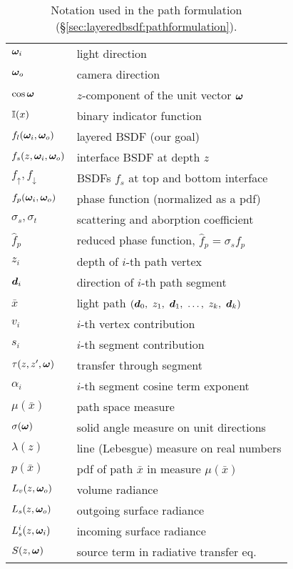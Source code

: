\begin{table}[h]
	\centering
	\caption[Notation used in the path formulation (\S\ref{sec:layeredbsdf:pathformulation})]{\label{tab:layeredbsdf:notation}
	Notation used in the path formulation (\S\ref{sec:layeredbsdf:pathformulation}).}
	\begin{tabular}{ll}
		$\bm{\omega}_i$ & light direction \\
		$\bm{\omega}_o$ & camera direction \\
		$\cos \bm{\omega}$ & $z$-component of the unit vector $\bm{\omega}$ \\
		$\mathbb{I}(x)$ & binary indicator function \\
		\hline
		
		$f_l(\bm{\omega}_i, \bm{\omega}_o)$ & layered BSDF (our goal) \\
		$f_s(z, \bm{\omega}_i, \bm{\omega}_o)$ & interface BSDF at depth $z$ \\
		$f_\uparrow, f_\downarrow$ & BSDFs $f_s$ at top and bottom interface \\
		$f_p(\bm{\omega}_i, \bm{\omega}_o)$ & phase function (normalized as a pdf) \\
		$\sigma_s, \sigma_t$ & scattering and aborption coefficient \\
		$\hat f_p$ & reduced phase function, $\hat f_p = \sigma_s f_p$ \\
		\hline
		
		$z_i$ & depth of $i$-th path vertex \\
		$\bm{d}_i$ & direction of $i$-th path segment \\
		$\bar x$ & light path $(\bd_0,\ z_1,\ \bd_1,\ \dots,\ z_k,\ \bd_k)$ \\
		$v_i$ & $i$-th vertex contribution \\
		$s_i$ & $i$-th segment contribution \\
		$\tau(z, z', \bm{\omega})$ & transfer through segment \\
		$\alpha_i$ & $i$-th segment cosine term exponent \\
		$\mu(\bar x)$ & path space measure \\
		$\sigma(\bm{\omega})$ & solid angle measure on unit directions \\
		$\lambda(z)$ & line (Lebesgue) measure on real numbers \\
		$p(\bar x)$ & pdf of path $\bar x$ in measure $\mu(\bar x)$ \\
		\hline
		
		$L_v(z, \bm{\omega}_o)$ & volume radiance \\
		$L_s(z, \bm{\omega}_o)$ & outgoing surface radiance \\
		$L^i_s(z, \bm{\omega}_i)$ & incoming surface radiance \\
		$S(z, \bm{\omega})$ & source term in radiative transfer eq. \\
	\end{tabular}
\end{table}
